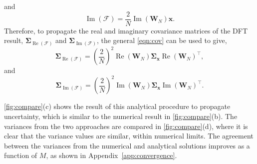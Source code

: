 \documentclass[reprint,
               superscriptaddress,
               nobibnotes,
               amsmath,
               amssymb,
               aps,
               hidelinks, 
               pre]{revtex4-2}
\renewcommand{\Re}{\operatorname{Re}}
\renewcommand{\Im}{\operatorname{Im}}
\begin{document}
%
and
%
\begin{equation}
    \Im(\bm{\mathcal{F}}) = \frac{2}{N}\Im\left(\mathbf{W}_N\right)\mathbf{x}.
\end{equation}
%
Therefore, to propagate the real and imaginary covariance matrices of the DFT result, $\boldsymbol{\Sigma}_{\Re\left(\bm{\mathcal{F}}\right)}$ and $\boldsymbol{\Sigma}_{\Im\left(\bm{\mathcal{F}}\right)}$, the general \cref{eqn:cov} can be used to give, 
%
\begin{equation}
    \boldsymbol{\Sigma}_{\Re\left(\bm{\mathcal{F}}\right)} = \left(\frac{2}{N}\right)^2 \Re\left(\mathbf{W}_N\right)\boldsymbol{\Sigma}_{\mathbf{x}} \Re\left(\mathbf{W}_N\right)^\top, 
    \label{eqn:real}
\end{equation}
%
and
%
\begin{equation}
    \boldsymbol{\Sigma}_{\Im\left(\bm{\mathcal{F}}\right)} = \left(\frac{2}{N}\right)^2 \Im\left(\mathbf{W}_N\right)\boldsymbol{\Sigma}_{\mathbf{x}} \Im\left(\mathbf{W}_N\right)^\top.
    \label{eqn:imag}
\end{equation}
%

\cref{fig:compare}(c) shows the result of this analytical procedure to propagate uncertainty, which is similar to the numerical result in \cref{fig:compare}(b). 
The variances from the two approaches are compared in \cref{fig:compare}(d), where it is clear that the variance values are similar, within numerical limits. 
The agreement between the variances from the numerical and analytical solutions improves as a function of $M$, as shown in Appendix~\ref{app:convergence}. 
\end{document}
